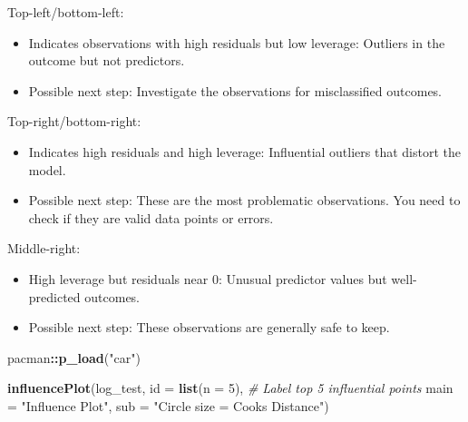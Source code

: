 \documentclass[
]{article}
\newenvironment{Shaded}{\begin{snugshade}}{\end{snugshade}}
\newcommand{\AttributeTok}[1]{\textcolor[rgb]{0.13,0.29,0.53}{#1}}
\newcommand{\CommentTok}[1]{\textcolor[rgb]{0.56,0.35,0.01}{\textit{#1}}}
\newcommand{\DecValTok}[1]{\textcolor[rgb]{0.00,0.00,0.81}{#1}}
\newcommand{\FunctionTok}[1]{\textcolor[rgb]{0.13,0.29,0.53}{\textbf{#1}}}
\newcommand{\NormalTok}[1]{#1}
\newcommand{\SpecialCharTok}[1]{\textcolor[rgb]{0.81,0.36,0.00}{\textbf{#1}}}
\newcommand{\StringTok}[1]{\textcolor[rgb]{0.31,0.60,0.02}{#1}}
\begin{document}
Top-left/bottom-left:

\begin{itemize}
\item
  Indicates observations with high residuals but low leverage: Outliers
  in the outcome but not predictors.
\item
  Possible next step: Investigate the observations for misclassified
  outcomes.
\end{itemize}

Top-right/bottom-right:

\begin{itemize}
\item
  Indicates high residuals and high leverage: Influential outliers that
  distort the model.
\item
  Possible next step: These are the most problematic observations. You
  need to check if they are valid data points or errors.
\end{itemize}

Middle-right:

\begin{itemize}
\item
  High leverage but residuals near 0: Unusual predictor values but
  well-predicted outcomes.
\item
  Possible next step: These observations are generally safe to keep.
\end{itemize}

\begin{Shaded}
\begin{Highlighting}[]
\NormalTok{pacman}\SpecialCharTok{::}\FunctionTok{p\_load}\NormalTok{(}\StringTok{"car"}\NormalTok{)}

\FunctionTok{influencePlot}\NormalTok{(log\_test, }
              \AttributeTok{id =} \FunctionTok{list}\NormalTok{(}\AttributeTok{n =} \DecValTok{5}\NormalTok{),  }\CommentTok{\# Label top 5 influential points}
              \AttributeTok{main =} \StringTok{"Influence Plot"}\NormalTok{,}
              \AttributeTok{sub =} \StringTok{"Circle size = Cook\textquotesingle{}s Distance"}\NormalTok{)}
\end{Highlighting}
\end{Shaded}
\end{document}
